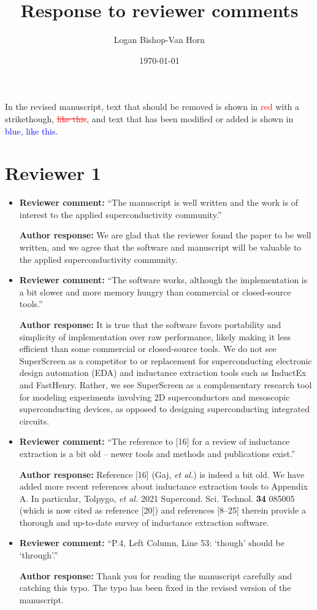 \documentclass{article} %
\title{Response to reviewer comments}
\author{Logan Bishop-Van Horn}
\date{\today}
\begin{document}
\maketitle

In the revised manuscript, text that should be removed is shown in \textcolor{red}{red} with a strikethough, \textcolor{red}{\sout{like this}}, and text that has been modified or added is shown in \textcolor{blue}{blue, like this}.

\section{Reviewer 1}

\begin{itemize}
    \item{
    {\bf Reviewer comment:} ``The manuscript is well written and the work is of interest to the applied superconductivity community.''
    
    {\bf Author response:} We are glad that the reviewer found the paper to be well written, and we agree that the software and manuscript will be valuable to the applied superconductivity community.
    }
    \item{
    {\bf Reviewer comment:} ``The software works, although the implementation is a bit slower and more memory hungry than commercial or closed-source tools.''
    
    {\bf Author response:} It is true that the software favors portability and simplicity of implementation over raw performance, likely making it less efficient than some commercial or closed-source tools. We do not see SuperScreen as a competitor to or replacement for superconducting electronic design automation (EDA) and inductance extraction tools such as InductEx and FastHenry. Rather, we see SuperScreen as a complementary research tool for modeling experiments involving 2D superconductors and mesoscopic superconducting devices, as opposed to designing superconducting integrated circuits. 
    }
    \item{
    {\bf Reviewer comment:} ``The reference to [16] for a review of inductance extraction is a bit old -- newer tools and methods and publications exist.''
    
    {\bf Author response:} Reference [16] (Gaj, \textit{et al.}) is indeed a bit old. We have added more recent references about inductance extraction tools to Appendix A. In particular, Tolpygo, \textit{et al.} 2021 Supercond. Sci. Technol. {\bf 34} 085005 (which is now cited as reference [20]) and references [8--25] therein provide a thorough and up-to-date survey of inductance extraction software.
    }
    \item{
    {\bf Reviewer comment:} ``P.4, Left Column, Line 53: `though' should be `through'.''
    
    {\bf Author response:} Thank you for reading the manuscript carefully and catching this typo. The typo has been fixed in the revised version of the manuscript.
    }
\end{itemize}
\end{document}
